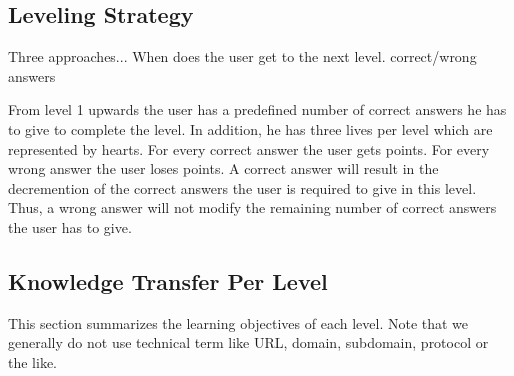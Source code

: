 \subsection{Leveling Strategy}
Three approaches...
When does the user get to the next level. correct/wrong answers


From level 1 upwards the user has a predefined number of correct answers he has to give to complete the level. In addition, he has three lives per level which are represented by hearts. For every correct answer the user gets points. For every wrong answer the user loses points. A correct answer will result in the decremention of the correct answers the user is required to give in this level. Thus, a wrong answer will not modify the remaining number of correct answers the user has to give. 
\subsection{Knowledge Transfer Per Level}
This section summarizes the learning objectives of each level. Note that we generally do not use technical term like URL, domain, subdomain, protocol or the like.

